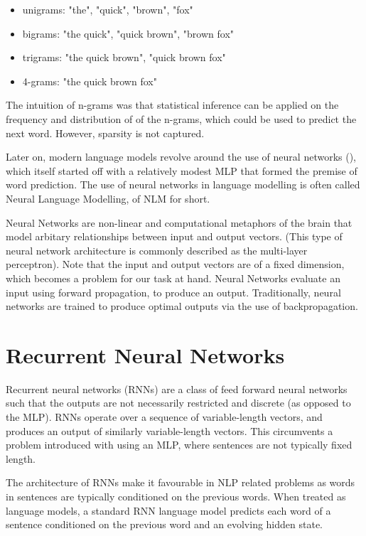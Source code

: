 \documentclass[12pt,twoside]{report}
\begin{document}
\begin{itemize}  
	\item unigrams: "the", "quick", "brown", "fox"
	\item bigrams: "the quick", "quick brown", "brown fox"
	\item trigrams: "the quick brown", "quick brown fox"
	\item 4-grams: "the quick brown fox"
\end{itemize}

The intuition of n-grams was that statistical inference can be applied on the frequency and distribution of of the n-grams, which could be used to predict the next word. However, sparsity is not captured.

Later on, modern language models revolve around the use of neural networks (\cite{bengio_neural_2001}), which itself started off with a relatively modest MLP that formed the premise of word prediction. The use of neural networks in language modelling is often called Neural Language Modelling, of NLM for short.

Neural Networks are non-linear and computational metaphors of the brain that model arbitary relationships between input and output vectors. (This type of neural network architecture is commonly described as the multi-layer perceptron). Note that the input and output vectors are of a fixed dimension, which becomes a problem for our task at hand. Neural Networks evaluate an input using forward propagation, to produce an output. Traditionally, neural networks are trained to produce optimal outputs via the use of backpropagation. 


\section{Recurrent Neural Networks}
\label{rnn}
Recurrent neural networks (RNNs) are a class of feed forward neural networks such that the outputs are not necessarily restricted and discrete (as opposed to the MLP). RNNs operate over a sequence of variable-length vectors, and produces an output of similarly variable-length vectors. This circumvents a problem introduced with using an MLP, where sentences are not typically fixed length. 

The architecture of RNNs make it favourable in NLP related problems as words in sentences are typically conditioned on the previous words. When treated as language models, a standard RNN language model predicts each word of a sentence conditioned on the previous word and an evolving hidden state.
\end{document}
